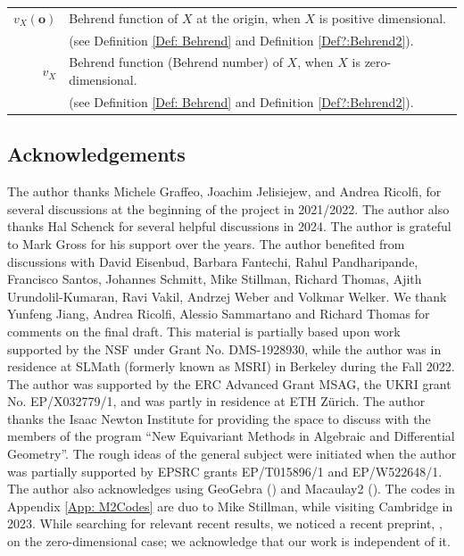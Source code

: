\documentclass[11pt,a4paper,leqno,noamsfonts]{amsart}
\numberwithin{equation}{section}
\begin{document}
 \begin{center}
 \begin{tabular}{r l}
  

    $v_X(\mathbf{o})$ & Behrend function of $X$ at the origin, when $X$ is positive dimensional. \\&(see Definition \ref{Def: Behrend} and Definition \ref{Def?:Behrend2}).\\
    $v_X$ & Behrend function (Behrend number) of $X$, when $X$ is zero-dimensional.\\
    &(see Definition \ref{Def: Behrend} and Definition \ref{Def?:Behrend2}).\\
     
   \end{tabular}
\end{center}


\subsection*{Acknowledgements} 

The author thanks Michele Graffeo, Joachim Jelisiejew, and Andrea Ricolfi, for several discussions at the beginning of the project in 2021/2022. The author also thanks Hal Schenck for several helpful discussions in 2024.  The author is grateful to Mark Gross for his support over the years. The author benefited from discussions with David Eisenbud, Barbara Fantechi, Rahul Pandharipande, 
 Francisco Santos,  Johannes Schmitt, Mike Stillman, Richard Thomas, Ajith Urundolil-Kumaran,
Ravi Vakil, Andrzej Weber
 and Volkmar Welker. We thank Yunfeng Jiang, Andrea Ricolfi, Alessio Sammartano and Richard Thomas for comments on the final draft. This material is partially based upon work supported by the NSF under Grant No. DMS-1928930, while the author was in residence at SLMath (formerly known as MSRI) in Berkeley during the Fall
2022. The author was supported by the ERC Advanced Grant MSAG, the UKRI grant No. EP/X032779/1, and was partly in residence at ETH Z\"urich. The author thanks the Isaac Newton Institute for providing the space to discuss with the members of the program ``New Equivariant Methods in Algebraic and Differential Geometry''.  The rough ideas of the general subject were initiated when the author was partially supported by EPSRC grants EP/T015896/1 and EP/W522648/1.
The author also acknowledges using GeoGebra (\cite{geogebra5}) and Macaulay2 (\cite{GS}). The codes in Appendix \ref{App: M2Codes} are duo to Mike Stillman, while visiting Cambridge in 2023. While searching for relevant recent results, we noticed a recent preprint, \cite{PSU26}, on the zero-dimensional case; we acknowledge that our work is independent of it.
\end{document}
